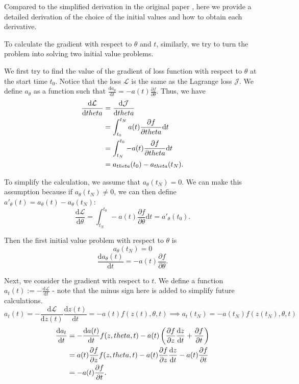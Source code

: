 \documentclass[a4paper,11pt,titlepage]{article}
\theoremstyle{definition}
\theoremstyle{plain}
\theoremstyle{remark}
\begin{document}
Compared to the simplified derivation in the original paper \cite{chen2018neural}, here we provide a detailed derivation of the choice of the initial values and how to obtain each derivative. 

To calculate the gradient with respect to $\theta$ and $t$, similarly, we try to turn the problem into solving two initial value problems.

We first try to find the value of the gradient of loss function with respect to $\theta$ at the start time $t_0$. Notice that the loss $\mathcal{L}$ is the same as the Lagrange loss $\mathcal{J}$. We define $a_\theta$ as a function such that $\frac{\mathrm{d}a_\theta}{\mathrm{d}t}=-a(t)\frac{\partial f}{\partial \theta}$. Thus, we have
\begin{align}
\frac{\mathrm{d}\mathcal{L}}{\mathrm{d} \theta}&=\frac{\mathrm{d}\mathcal{J}}{\mathrm{d} \theta}\notag\\
&=\int_{t_0}^{t_N}a(t)\frac{\partial f}{\partial \theta}\mathrm{d}t\notag\\
&=\int_{t_N}^{t_0}-a(t)\frac{\partial f}{\partial \theta}\mathrm{d}t\notag\\
&=a_{\theta}(t_0)-a_{\theta}(t_N).\notag
\end{align}

To simplify the calculation, we assume that $a_\theta(t_N)=0$. We can make this assumption because if $a_\theta(t_N)\neq0$, we can then define $a'_\theta(t)=a_\theta(t)-a_\theta(t_N)$:
$$
\frac{\mathrm{d}\mathcal{L}}{\mathrm{d}\theta}=\int_{t_N}^{t_0}-a(t)\frac{\partial f}{\partial \theta}\mathrm{d}t=a'_\theta(t_0).
$$

Then the first initial value problem with respect to $\theta$ is 
$$a_\theta(t_N)=0$$
\begin{equation}\label{eq8}
    \frac{\mathrm{d}a_{\theta}(t)}{\mathrm{d}t} = -a(t)\frac{\partial f}{\partial \theta}.
\end{equation}

Next, we consider the gradient with respect to $t$. We define a function $a_t(t):=-\frac{\mathrm{d}\mathcal{L}}{\mathrm{d} t}$ - note that the minus sign here is added to simplify future calculations.
$$
a_t(t) = -\frac{\mathrm{d}\mathcal{L}}{\mathrm{d} z(t)}\frac{\mathrm{d} z(t)}{\mathrm{d}t}=-a(t)f\left(z(t),\theta, t\right)\implies a_t(t_N) = -a(t_N)f\left(z(t_N),\theta, t\right)
$$
\begin{align}
\frac{\mathrm{d}a_t}{\mathrm{d}t}&=-\frac{\mathrm{d}a(t)}{\mathrm{d}t}f(z,\theta,t)-a(t)\left(\frac{\partial f}{\partial z}\frac{\mathrm{d}z}{\mathrm{d}t}+\frac{\partial f}{\partial t}\right)\notag\\
&=a(t)\frac{\partial f}{\partial z}f(z,\theta,t)-a(t)\frac{\partial f}{\partial z}\frac{\mathrm{d}z}{\mathrm{d}t}-a(t)\frac{\partial f}{\partial t}\notag\\
&=-a(t)\frac{\partial f}{\partial t}.\notag
\end{align}
\end{document}
